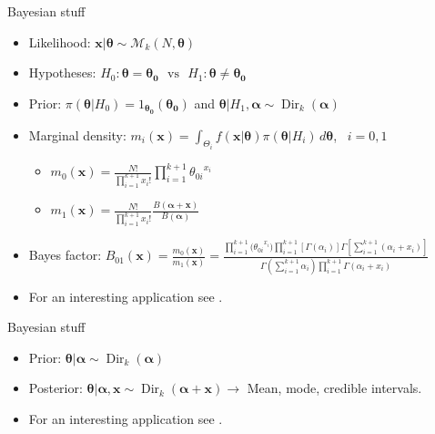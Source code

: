 \begin{frame}{Bayesian stuff}
	\begin{itemize}
	\item Likelihood: $\bm{x}|\bm{\theta} \sim \mathcal{M}_k(N,\bm{\theta})$
	\item Hypotheses:  $ H_0: \bm{\theta}=\bm{\theta_0} \,\,\,\, \text{vs} \,\,\,\,  H_1: \bm{\theta} \neq \bm{\theta_0}$
	\item Prior: $\pi(\bm{\theta}|H_0)={1_{\bm{\theta_0}}(\bm{\theta_0})}$ and $\bm{\theta}|H_1, \bm{\alpha} \sim \operatorname{Dir}_k(\bm{\alpha})$ 
	\item Marginal density: $m_i(\bm{x})=\int_{\Theta_i} f(\bm{x}|\bm{\theta})\pi(\bm{\theta}|H_i) \, d\bm{\theta} $, \, $i=0,1$
		\begin{itemize}
		\item  $m_0(\bm{x})=\frac{N!}{\prod_{i=1}^{k+1}x_i!}\prod_{i=1}^{k+1}{\theta_{0i}}^{x_i}$ 
		\item  $m_1(\bm{x})= \frac{N!}{\prod_{i=1}^{k+1}x_i!}\frac{B(\bm{\alpha}+\bm{x})}{B(\bm{\alpha})}$ 
		\end{itemize}
	\item Bayes factor: $B_{01}(\bm{x}) = \frac{m_0(\bm{x})}{m_1(\bm{x})} = \frac{\prod_{i=1}^{k+1}{(\theta_{0i}}^{x_i}) \prod_{i=1}^{k+1}[\Gamma(\alpha_i)] \Gamma [\sum_{i=1}^{k+1}(\alpha_i+x_i)]}{\Gamma(\sum_{i=1}^{k+1} \alpha_i) \prod_{i=1}^{k+1}\Gamma(\alpha_i+x_i)}$
	\item For an interesting application see \citet{pericchiTorres2011}.
	\end{itemize}
\end{frame}

\begin{frame}{Bayesian stuff}
	\begin{itemize}
	\item Prior: $\bm{\theta}|\bm{\alpha} \sim \operatorname{Dir}_k(\bm{\alpha})$
	\item Posterior: $\bm{\theta} | \bm{\alpha}, \bm{x} \sim \operatorname{Dir}_k(\bm{\alpha} + \bm{x}) \rightarrow$ Mean, mode, credible intervals.
	\item For an interesting application see \citet{ley1996peculiar}.
	\end{itemize}
\end{frame}

